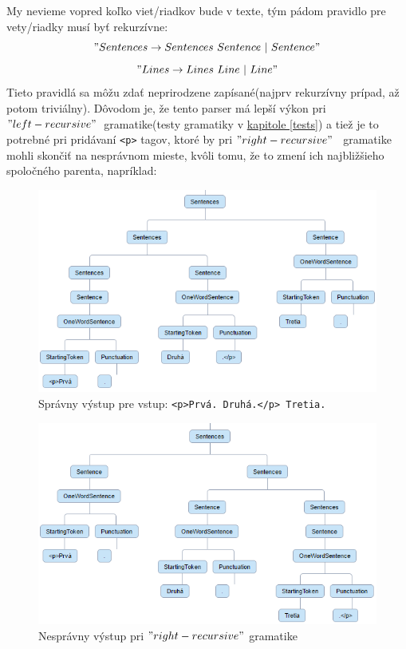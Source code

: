 \documentclass[12pt,a4paper]{report}
\theoremstyle{definition}
\theoremstyle{remark}
\begin{document}
My nevieme vopred koľko viet/riadkov bude v texte, tým pádom pravidlo pre vety/riadky musí byť rekurzívne: $$"Sentences \to Sentences \ Sentence \ | \ Sentence"$$  $$"Lines \to Lines \ Line \ | \ Line"$$
Tieto pravidlá sa môžu zdať neprirodzene zapísané(najprv rekurzívny prípad, až potom triviálny). Dôvodom je, že tento parser má lepší výkon pri $"left-recursive"$\  gramatike(testy gramatiky v \hyperref[tests]{kapitole \ref{tests}}) a tiež je to potrebné pri pridávaní \verb!<p>! tagov, ktoré by pri $"right-recursive"$ \ gramatike mohli skončiť na nesprávnom mieste, kvôli tomu, že to zmení ich najbližšieho spoločného parenta, napríklad:
\begin{figure}[H]

\includegraphics[scale=2.1]{treePTagsCorrect}
\caption{Správny výstup pre vstup: \texttt{<p>Prvá. Druhá.</p> Tretia.}}
\end{figure}
\begin{figure}[H]
\includegraphics[scale=2.1]{treePTagsIncorrect}
\caption{Nesprávny výstup pri $"right-recursive"$ gramatike}
\end{figure}
\end{document}
